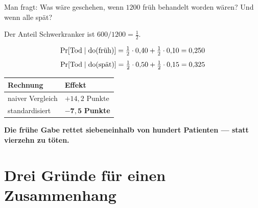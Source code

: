 \begin{merksatz}
Man fragt: Was wäre geschehen, wenn  $1200$ früh behandelt worden wären? Und wenn alle spät?

Der Anteil Schwerkranker ist $600/1200 = \tfrac12$.

\[ \Pr[\text{Tod} \mid \operatorname{do}(\text{früh})] = \tfrac12\cdot0{,}40 + \tfrac12\cdot0{,}10 = 0{,}250 \]
\[ \Pr[\text{Tod} \mid \operatorname{do}(\text{spät})] = \tfrac12\cdot0{,}50 + \tfrac12\cdot0{,}15 = 0{,}325 \]

\begin{center}
{\small
\renewcommand{\arraystretch}{1.5}
\begin{tabular}{@{}P{3.4cm}P{2.6cm}@{}}
\toprule
\textbf{Rechnung} & \textbf{Effekt}\\
\midrule
naiver Vergleich & $+14{,}2$ Punkte\\
standardisiert & $\mathbf{-7{,}5}$ \textbf{Punkte}\\
\bottomrule
\end{tabular}}
\end{center}

\begin{center}
\begin{minipage}{0.9\textwidth}
\textbf{Die frühe Gabe rettet siebeneinhalb von hundert Patienten --- statt vierzehn zu töten.}
\end{minipage}
\end{center}

\begin{center}
\begin{minipage}{0.88\textwidth}
\end{minipage}
\end{center}
\end{merksatz}

\section{Drei Gründe für einen Zusammenhang}

